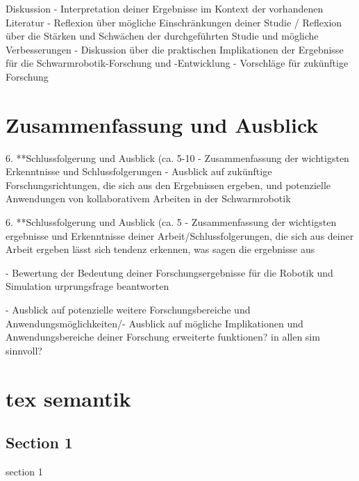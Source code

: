 \documentclass[german,version-2020-11]{uzl-thesis}
\begin{document}
Diskussion 
      - Interpretation deiner Ergebnisse im Kontext der vorhandenen Literatur 
      - Reflexion über mögliche Einschränkungen deiner Studie / Reflexion über die Stärken und Schwächen der durchgeführten Studie und mögliche Verbesserungen
      - Diskussion über die praktischen Implikationen der Ergebnisse für die Schwarmrobotik-Forschung und -Entwicklung
      - Vorschläge für zukünftige Forschung
      

\chapter{Zusammenfassung und Ausblick}


%


6. **Schlussfolgerung und Ausblick (ca. 5-10%
   - Zusammenfassung der wichtigsten Erkenntnisse und Schlussfolgerungen
   - Ausblick auf zukünftige Forschungsrichtungen, die sich aus den Ergebnissen ergeben, und potenzielle Anwendungen von kollaborativem Arbeiten in der Schwarmrobotik




6. **Schlussfolgerung und Ausblick (ca. 5%
   - Zusammenfassung der wichtigsten ergebnisse und Erkenntnisse deiner Arbeit/Schlussfolgerungen, die sich aus deiner Arbeit ergeben
   lässt sich tendenz erkennen, was sagen die ergebnisse aus

   - Bewertung der Bedeutung deiner Forschungsergebnisse für die Robotik und Simulation
   urprungsfrage beantworten
   
   - Ausblick auf potenzielle weitere Forschungsbereiche und Anwendungsmöglichkeiten/- Ausblick auf mögliche Implikationen und Anwendungsbereiche deiner Forschung
   erweiterte funktionen?
   in allen sim sinnvoll?



\chapter{tex semantik}

\section{Section 1}
section 1
\end{document}
